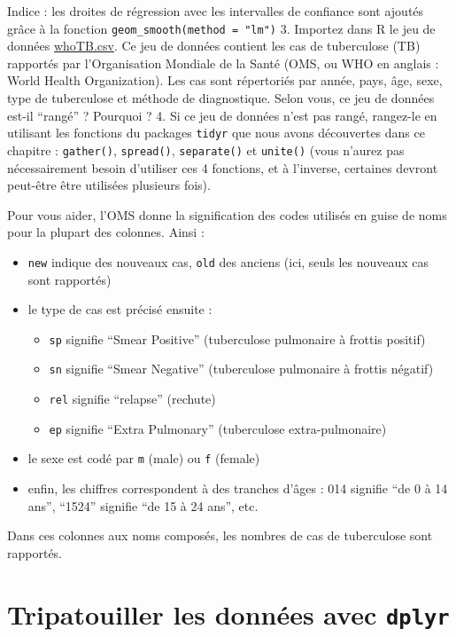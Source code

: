 \documentclass[a4paperpaper,]{article}
\providecommand{\tightlist}{%
  \setlength{\itemsep}{0pt}\setlength{\parskip}{0pt}}
\begin{document}
Indice : les droites de régression avec les intervalles de confiance sont ajoutés grâce à la fonction \texttt{geom\_smooth(method\ =\ "lm")}
3. Importez dans R le jeu de données \href{data/whoTB.csv}{whoTB.csv}. Ce jeu de données contient les cas de tuberculose (TB) rapportés par l'Organisation Mondiale de la Santé (OMS, ou WHO en anglais : World Health Organization). Les cas sont répertoriés par année, pays, âge, sexe, type de tuberculose et méthode de diagnostique. Selon vous, ce jeu de données est-il ``rangé'' ? Pourquoi ?
4. Si ce jeu de données n'est pas rangé, rangez-le en utilisant les fonctions du packages \texttt{tidyr} que nous avons découvertes dans ce chapitre : \texttt{gather()}, \texttt{spread()}, \texttt{separate()} et \texttt{unite()} (vous n'aurez pas nécessairement besoin d'utiliser ces 4 fonctions, et à l'inverse, certaines devront peut-être être utilisées plusieurs fois).

Pour vous aider, l'OMS donne la signification des codes utilisés en guise de noms pour la plupart des colonnes. Ainsi :

\begin{itemize}
\tightlist
\item
  \texttt{new} indique des nouveaux cas, \texttt{old} des anciens (ici, seuls les nouveaux cas sont rapportés)
\item
  le type de cas est précisé ensuite :

  \begin{itemize}
  \tightlist
  \item
    \texttt{sp} signifie ``Smear Positive'' (tuberculose pulmonaire à frottis positif)
  \item
    \texttt{sn} signifie ``Smear Negative'' (tuberculose pulmonaire à frottis négatif)
  \item
    \texttt{rel} signifie ``relapse'' (rechute)
  \item
    \texttt{ep} signifie ``Extra Pulmonary'' (tuberculose extra-pulmonaire)
  \end{itemize}
\item
  le sexe est codé par \texttt{m} (male) ou \texttt{f} (female)
\item
  enfin, les chiffres correspondent à des tranches d'âges : 014 signifie ``de 0 à 14 ans'', ``1524'' signifie ``de 15 à 24 ans'', etc.
\end{itemize}

Dans ces colonnes aux noms composés, les nombres de cas de tuberculose sont rapportés.

\hypertarget{wrangling}{%
\section{\texorpdfstring{Tripatouiller les données avec \texttt{dplyr}}{Tripatouiller les données avec dplyr}}\label{wrangling}}
\end{document}
